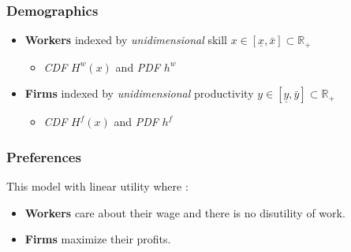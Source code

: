\documentclass[12pt]{article}
\theoremstyle{definition}
\begin{document}
\subsubsection{Demographics}
\begin{itemize}
    \item  \textbf{Workers} indexed by \textit{unidimensional} skill $x\in[\underline{x},  \bar{x} ]\subset \mathbb{R}_+$
    \begin{itemize}
    	\item  \textit{CDF} $H^w(x)$ and \textit{PDF} $h^w$  
	\end{itemize}
    \item  \textbf{Firms} indexed by \textit{unidimensional} productivity $y\in[\underline{y},  \bar{y} ]\subset \mathbb{R}_+$
    \begin{itemize}
	    \item \textit{CDF} $H^f(x)$ and \textit{PDF} $h^f$  
	\end{itemize}
\end{itemize}

\subsubsection{Preferences}
This model with linear utility where :
\begin{itemize}
    \item \textbf{Workers} care about their wage and there is no disutility of work.
    \item  \textbf{Firms} maximize their profits.
\end{itemize}
\end{document}
